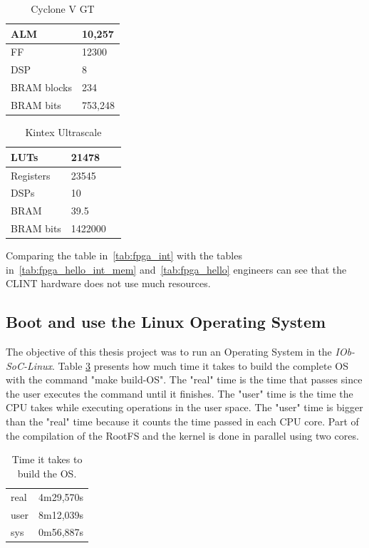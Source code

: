 \begin{table}[!ht]
    \centering
    \begin{tabular}{|l|l|}
        \hline
        ALM         & 10,257  \\ \hline
        FF          & 12300   \\ \hline
        DSP         & 8       \\ \hline
        BRAM blocks & 234     \\ \hline
        BRAM bits   & 753,248 \\ \hline
    \end{tabular}
    \caption{Cyclone V GT}
    \label{tab:cyclone_int}
\end{table}
\begin{table}[!ht]
    \centering
    \begin{tabular}{|l|l|l|}
        \hline
        LUTs      & 21478   \\ \hline
        Registers & 23545   \\ \hline
        DSPs      & 10      \\ \hline
        BRAM      & 39.5    \\ \hline
        BRAM bits & 1422000 \\ \hline
    \end{tabular}
    \caption{Kintex Ultrascale}
    \label{tab:kintex_int}
\end{table}

Comparing the table in~\ref{tab:fpga_int} with the tables in~\ref{tab:fpga_hello_int_mem} and~\ref{tab:fpga_hello} engineers can see that the CLINT hardware does not use much resources.

\subsection{Boot and use the Linux Operating System}

The objective of this thesis project was to run an Operating System in the \textit{IOb-SoC-Linux}. Table \ref{tab:time_os} presents how much time it takes to build the complete OS with the command "make build-OS". The "real" time is the time that passes since the user executes the command until it finishes. The "user" time is the time the CPU takes while executing operations in the user space. The "user" time is bigger than the "real" time because it counts the time passed in each CPU core. Part of the compilation of the RootFS and the kernel is done in parallel using two cores.

\begin{table}[!ht]
    \centering
    \begin{tabular}{ll}
    real & 4m29,570s \\
    user & 8m12,039s \\
    sys  & 0m56,887s
    \end{tabular}
    \caption{Time it takes to build the OS.}
    \label{tab:time_os}
\end{table}

